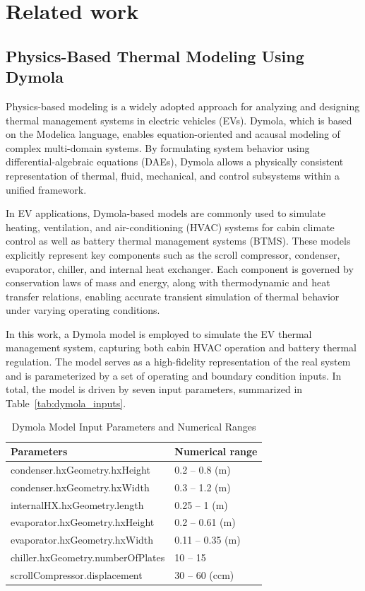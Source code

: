 \chapter{Related work}

\section{Physics-Based Thermal Modeling Using Dymola}


Physics-based modeling is a widely adopted approach for analyzing and designing thermal management systems in electric vehicles (EVs). Dymola, which is based on the Modelica language, enables equation-oriented and acausal modeling of complex multi-domain systems. By formulating system behavior using differential-algebraic equations (DAEs), Dymola allows a physically consistent representation of thermal, fluid, mechanical, and control subsystems within a unified framework.

In EV applications, Dymola-based models are commonly used to simulate heating, ventilation, and air-conditioning (HVAC) systems for cabin climate control as well as battery thermal management systems (BTMS). These models explicitly represent key components such as the scroll compressor, condenser, evaporator, chiller, and internal heat exchanger. Each component is governed by conservation laws of mass and energy, along with thermodynamic and heat transfer relations, enabling accurate transient simulation of thermal behavior under varying operating conditions.

In this work, a Dymola model is employed to simulate the EV thermal management system, capturing both cabin HVAC operation and battery thermal regulation. The model serves as a high-fidelity representation of the real system and is parameterized by a set of operating and boundary condition inputs. In total, the model is driven by seven input parameters, summarized in Table~\ref{tab:dymola_inputs}.

\begin{table}[h!]
\centering
\caption{Dymola Model Input Parameters and Numerical Ranges}
\label{tab:dymola_input_ranges}
\renewcommand{\arraystretch}{1.3}
\begin{tabular}{|p{8cm}|p{5cm}|}
\hline
{\textbf{Parameters}} &
{\textbf{Numerical range}} \\
\hline
condenser.hxGeometry.hxHeight & 0.2 -- 0.8 (m) \\
\hline
condenser.hxGeometry.hxWidth & 0.3 -- 1.2 (m) \\
\hline
internalHX.hxGeometry.length & 0.25 -- 1 (m) \\
\hline
evaporator.hxGeometry.hxHeight & 0.2 -- 0.61 (m) \\
\hline
evaporator.hxGeometry.hxWidth & 0.11 -- 0.35 (m) \\
\hline
chiller.hxGeometry.numberOfPlates & 10 -- 15 \\
\hline
scrollCompressor.displacement & 30 -- 60 (ccm) \\
\hline
\end{tabular}
\end{table}

